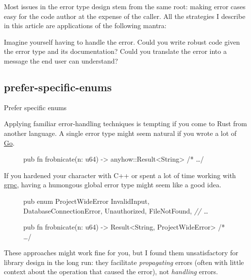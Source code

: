 \documentclass{article}
\begin{document}
Most issues in the error type design stem from the same root: making error cases easy for the code author at the expense of the caller.
All the strategies I describe in this article are applications of the following mantra:


Imagine yourself having to handle the error.
Could you write robust code given the error type and its documentation?
Could you translate the error into a message the end user can understand?

\subsection{prefer-specific-enums}{Prefer specific enums}

Applying familiar error-handling techniques is tempting if you come to Rust from another language.
A single error type might seem natural if you wrote a lot of \href{https://go.dev}{Go}.

\begin{figure}
\begin{code}[bad]
pub fn frobnicate(n: u64) -> anyhow::Result<String> { /* \ldots  */ }
\end{code}
\end{figure}

If you hardened your character with C++ or spent a lot of time working with \href{https://grpc.github.io/grpc/core/md_doc_statuscodes.html}{grpc}, having a humongous global error type might seem like a good idea.

\begin{figure}
\begin{code}[bad]
pub enum ProjectWideError {
  InvalidInput,
  DatabaseConnectionError,
  Unauthorized,
  FileNotFound,
  \emph{// \ldots }
}

pub fn frobnicate(n: u64) -> Result<String, ProjectWideError> { /* \ldots  */ }
\end{code}
\end{figure}

These approaches might work fine for you, but I found them unsatisfactory for library design in the long run: they facilitate \emph{propagating} errors (often with little context about the operation that caused the error), not \emph{handling} errors.
\end{document}
